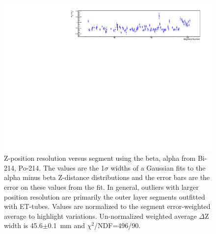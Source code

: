 \begin{figure}[!h]
\centering
\includegraphics[width=1.05\textwidth]{figures/PubBiPo214dZWidthvsCell.pdf}
\caption{\label{fig:ZresvsCell214}Z-position resolution versus segment using the beta, alpha from Bi-214, Po-214. The values are the 1$\sigma$ widths of a Gaussian fits to the alpha minus beta Z-distance distributions and the error bars are the error on these values from the fit. In general, outliers with larger position resolution are primarily the outer layer segments outfitted with ET-tubes. Values are normalized to the segment error-weighted average to highlight variations. Un-normalized weighted average $\Delta$Z width is 45.6$\pm$0.1~mm and $\chi^2$/NDF=496/90.}
\end{figure}
\clearpage
\newpage
